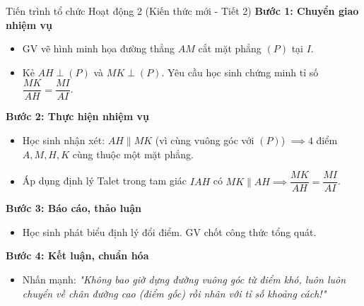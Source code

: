 \documentclass[12pt, a4paper]{article}
\begin{document}
\begin{pedabox}{Tiến trình tổ chức Hoạt động 2 (Kiến thức mới - Tiết 2)}
    \textbf{Bước 1: Chuyển giao nhiệm vụ}
    \begin{itemize}[leftmargin=0.6cm]
        \item GV vẽ hình minh họa đường thẳng $AM$ cắt mặt phẳng $(P)$ tại $I$.
        \item Kẻ $AH \perp (P)$ và $MK \perp (P)$. Yêu cầu học sinh chứng minh tỉ số $\dfrac{MK}{AH} = \dfrac{MI}{AI}$.
    \end{itemize}

    \textbf{Bước 2: Thực hiện nhiệm vụ}
    \begin{itemize}[leftmargin=0.6cm]
        \item Học sinh nhận xét: $AH \parallel MK$ (vì cùng vuông góc với $(P)$) $\implies 4$ điểm $A, M, H, K$ cùng thuộc một mặt phẳng.
        \item Áp dụng định lý Talet trong tam giác $IAH$ có $MK \parallel AH \implies \dfrac{MK}{AH} = \dfrac{MI}{AI}$.
    \end{itemize}

    \textbf{Bước 3: Báo cáo, thảo luận}
    \begin{itemize}[leftmargin=0.6cm]
        \item Học sinh phát biểu định lý đổi điểm. GV chốt công thức tổng quát.
    \end{itemize}

    \textbf{Bước 4: Kết luận, chuẩn hóa}
    \begin{itemize}[leftmargin=0.6cm]
        \item Nhấn mạnh: \textit{"Không bao giờ dựng đường vuông góc từ điểm khó, luôn luôn chuyển về chân đường cao (điểm gốc) rồi nhân với tỉ số khoảng cách!"}
    \end{itemize}
\end{pedabox}
\end{document}
